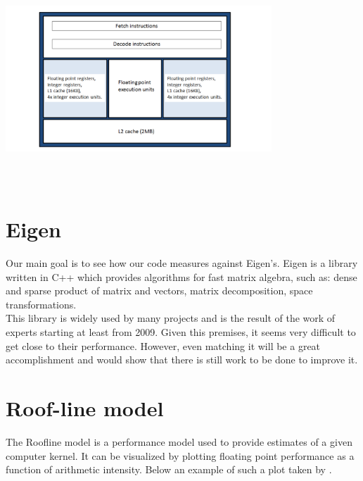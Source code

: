 \documentclass[11pt,a4paper,oneside,titlepage,openright]{book}
\begin{document}
\begin{center}
\includegraphics[width=10cm, height=8cm]{interlagos}
\end{center}

\section{Eigen}
Our main goal is to see how our code measures against Eigen's. 
Eigen is a library written in C++ which provides algorithms for fast matrix algebra, such as: dense and sparse product of matrix and vectors, matrix decomposition, space transformations. \\This library is widely used by many projects and is the result of the work of experts starting at least from 2009. Given this premises, it seems very difficult to get close to their performance. However, even matching it will be a great accomplishment and would show that there is still work to be done to improve it. 

\section{Roof-line model}
The Roofline model is a performance model used to provide estimates of a given computer kernel. 
It can be visualized by plotting floating point performance as a function of arithmetic intensity. 
Below an example of such a plot taken by \cite{roofmodel}.
\end{document}
